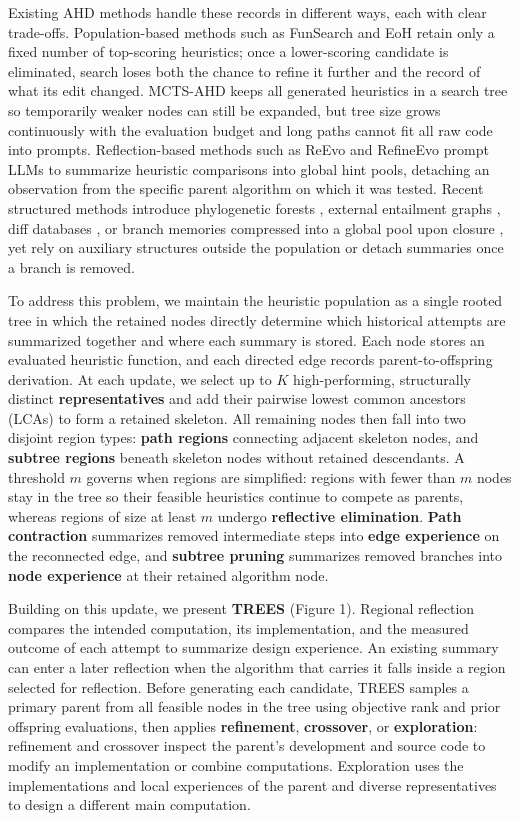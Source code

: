 \documentclass{article}
\begin{document}
Existing AHD methods handle these records in different ways, each with clear trade-offs. Population-based methods such as FunSearch \citep{funsearch} and EoH \citep{eoh} retain only a fixed number of top-scoring heuristics; once a lower-scoring candidate is eliminated, search loses both the chance to refine it further and the record of what its edit changed. MCTS-AHD \citep{mctsahd} keeps all generated heuristics in a search tree so temporarily weaker nodes can still be expanded, but tree size grows continuously with the evaluation budget and long paths cannot fit all raw code into prompts. Reflection-based methods such as ReEvo \citep{reevo} and RefineEvo \citep{refineevo} prompt LLMs to summarize heuristic comparisons into global hint pools, detaching an observation from the specific parent algorithm on which it was tested. Recent structured methods introduce phylogenetic forests \citep{phyloevolve}, external entailment graphs \citep{pathwise}, diff databases \citep{deltaevolve}, or branch memories compressed into a global pool upon closure \citep{memorytree}, yet rely on auxiliary structures outside the population or detach summaries once a branch is removed.

To address this problem, we maintain the heuristic population as a single rooted tree in which the retained nodes directly determine which historical attempts are summarized together and where each summary is stored. Each node stores an evaluated heuristic function, and each directed edge records parent-to-offspring derivation. At each update, we select up to \(K\) high-performing, structurally distinct \textbf{representatives} and add their pairwise lowest common ancestors (LCAs) to form a retained skeleton. All remaining nodes then fall into two disjoint region types: \textbf{path regions} connecting adjacent skeleton nodes, and \textbf{subtree regions} beneath skeleton nodes without retained descendants. A threshold \(m\) governs when regions are simplified: regions with fewer than \(m\) nodes stay in the tree so their feasible heuristics continue to compete as parents, whereas regions of size at least \(m\) undergo \textbf{reflective elimination}. \textbf{Path contraction} summarizes removed intermediate steps into \textbf{edge experience} on the reconnected edge, and \textbf{subtree pruning} summarizes removed branches into \textbf{node experience} at their retained algorithm node.

Building on this update, we present \textbf{TREES} (Figure 1). Regional reflection compares the intended computation, its implementation, and the measured outcome of each attempt to summarize design experience. An existing summary can enter a later reflection when the algorithm that carries it falls inside a region selected for reflection. Before generating each candidate, TREES samples a primary parent from all feasible nodes in the tree using objective rank and prior offspring evaluations, then applies \textbf{refinement}, \textbf{crossover}, or \textbf{exploration}: refinement and crossover inspect the parent's development and source code to modify an implementation or combine computations. Exploration uses the implementations and local experiences of the parent and diverse representatives to design a different main computation.
\end{document}
